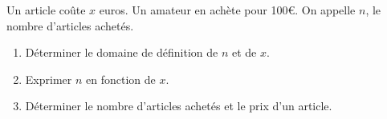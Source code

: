 
Un article coûte $x$ euros. Un amateur en achète pour 100€.
On appelle $n$, le nombre d'articles achetés.
\begin{enumerate}
\item Déterminer le domaine de définition de $n$ et de $x$.
\item Exprimer $n$ en fonction de $x$.
\item Déterminer le nombre d’articles achetés et le prix d’un article.
\end{enumerate}
 